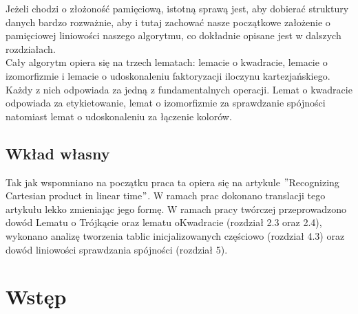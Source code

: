 \documentclass[12pt,a4paper,titlepage]{article}
\begin{document}
Jeżeli chodzi o złożoność pamięciową, istotną sprawą jest, aby dobierać struktury danych bardzo rozważnie, aby i tutaj zachować nasze początkowe założenie o pamięciowej liniowości naszego algorytmu, co dokładnie opisane jest w dalszych rozdziałach. \\
Cały algorytm opiera się na trzech lematach: lemacie o kwadracie, lemacie o izomorfizmie i lemacie o udoskonaleniu faktoryzacji iloczynu kartezjańskiego. Każdy z nich odpowiada za jedną z fundamentalnych operacji. Lemat o kwadracie odpowiada za etykietowanie, lemat o izomorfizmie za sprawdzanie spójności natomiast lemat o udoskonaleniu za łączenie kolorów.
\subsection{Wkład własny}
Tak jak wspomniano na początku praca ta opiera się na artykule $"$Recognizing Cartesian product in linear time$"$. W ramach prac dokonano translacji tego artykułu lekko zmieniając jego formę. W ramach pracy twórczej przeprowadzono dowód Lematu o Trójkącie oraz lematu oKwadracie (rozdział 2.3 oraz 2.4), wykonano analizę tworzenia tablic inicjalizowanych częściowo (rozdział 4.3) oraz dowód liniowości sprawdzania spójności (rozdział 5).  
\newpage

\section{Wstęp}
\end{document}
